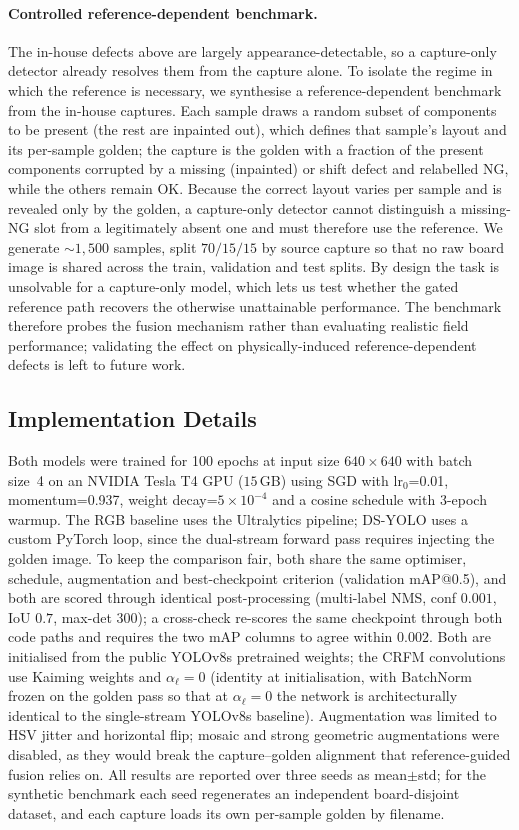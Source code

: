 \documentclass[conference]{IEEEtran}
\begin{document}
\paragraph*{Controlled reference-dependent benchmark.}
The in-house defects above are largely appearance-detectable, so a capture-only
detector already resolves them from the capture alone. To isolate the regime in
which the reference is necessary, we synthesise a reference-dependent benchmark
from the in-house captures. Each sample draws a random subset of components to be
present (the rest are inpainted out), which defines that sample's layout and its
per-sample golden; the capture is the golden with a fraction of the present
components corrupted by a missing (inpainted) or shift defect and relabelled NG,
while the others remain OK. Because the correct layout varies per sample and is
revealed only by the golden, a capture-only detector cannot distinguish a
missing-NG slot from a legitimately absent one and must therefore use the
reference. We generate ${\sim}1{,}500$ samples, split $70/15/15$ by source capture
so that no raw board image is shared across the train, validation and test splits.
By design the task is unsolvable for a capture-only model, which lets us test
whether the gated reference path recovers the otherwise unattainable performance.
The benchmark therefore probes the fusion mechanism rather than evaluating
realistic field performance; validating the effect on physically-induced
reference-dependent defects is left to future work.

\subsection{Implementation Details}
Both models were trained for 100 epochs at input size $640\times640$ with batch
size~4 on an NVIDIA Tesla T4 GPU ($15$\,GB) using SGD with lr$_0$=0.01,
momentum=0.937, weight decay=$5\!\times\!10^{-4}$ and a cosine schedule with
3-epoch warmup. The RGB baseline uses the Ultralytics pipeline; DS-YOLO uses a
custom PyTorch loop, since the dual-stream forward pass requires injecting the
golden image. To keep the comparison fair, both share the same optimiser,
schedule, augmentation and best-checkpoint criterion (validation mAP@0.5), and
both are scored through identical post-processing (multi-label NMS, conf $0.001$,
IoU $0.7$, max-det $300$); a cross-check re-scores the same checkpoint through both
code paths and requires the two mAP columns to agree within $0.002$. Both are
initialised from the public YOLOv8s pretrained weights; the CRFM convolutions use
Kaiming weights and
$\alpha_\ell=0$ (identity at initialisation, with BatchNorm frozen on the golden
pass so that at $\alpha_\ell=0$ the network is architecturally identical to the
single-stream YOLOv8s baseline). Augmentation was limited to HSV jitter and
horizontal flip; mosaic and strong geometric augmentations were disabled, as they
would break the capture--golden alignment that reference-guided fusion relies on. All results are reported over three
seeds as mean$\pm$std; for the synthetic benchmark each seed regenerates an
independent board-disjoint dataset, and each capture loads its own per-sample
golden by filename.
\end{document}

